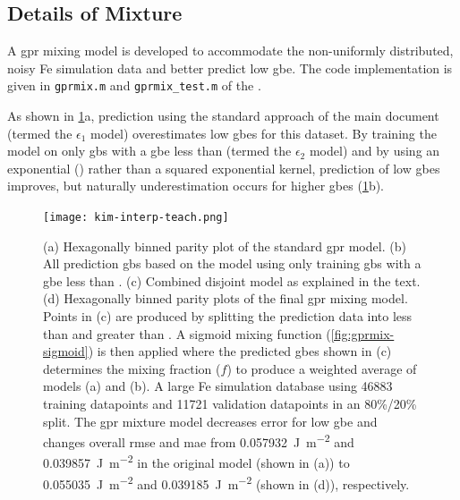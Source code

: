 \documentclass[preprint,12pt]{elsarticle}
\begin{document}
\subsection{Details of  Mixture}
\label{sec:supp:kim-interp:method}

A \gls{gpr} mixing model is developed to accommodate the non-uniformly distributed, noisy Fe simulation data \cite{kimPhasefieldModeling3D2014} and better predict low \gls{gbe}. The code implementation is given in \texttt{gprmix.m} and \texttt{gprmix\_test.m} of the \vfzorepo{} \cite{bairdFiveDegreeofFreedom5DOF2020}.

As shown in \cref{fig:kim-interp-teach}a, prediction using the standard approach of the main document (termed the $\epsilon_1$ model) overestimates low \glspl{gbe} for this dataset. By training the model on only \glspl{gb} with a \gls{gbe} less than \thrtwo{} (termed the $\epsilon_2$ model) and by using an exponential () rather than a squared exponential kernel, prediction of low \glspl{gbe} improves, but naturally underestimation occurs for higher \glspl{gbe} (\cref{fig:kim-interp-teach}b).

\begin{figure}
    \centering
    \texttt{[image: kim-interp-teach.png]}
    \caption{(a) Hexagonally binned parity plot of the standard \gls{gpr} model. (b) All prediction \glspl{gb} based on the model using only training \glspl{gb} with a \gls{gbe} less than \thrtwo{}. (c) Combined disjoint model as explained in the text. (d) Hexagonally binned parity plots of the final \gls{gpr} mixing model. Points in (c) are produced by splitting the prediction data into less than and greater than \thr{}. A sigmoid mixing function (\cref{fig:gprmix-sigmoid}) is then applied where the predicted \glspl{gbe} shown in (c) determines the mixing fraction ($f$) to produce a weighted average of models (a) and (b). A large Fe simulation database \cite{kimPhasefieldModeling3D2014} using \num{46883} training datapoints and \num{11721} validation datapoints in an 80\%/20\% split. The \gls{gpr} mixture model decreases error for low \gls{gbe} and changes overall \gls{rmse} and \gls{mae} from \SI{0.057932}{\J\per\square\meter} and \SI{0.039857}{\J\per\square\meter} in the original model (shown in (a)) to \SI{0.055035}{\J\per\square\meter} and \SI{0.039185}{\J\per\square\meter} (shown in (d)), respectively.}
    \label{fig:kim-interp-teach}
\end{figure}
\end{document}
